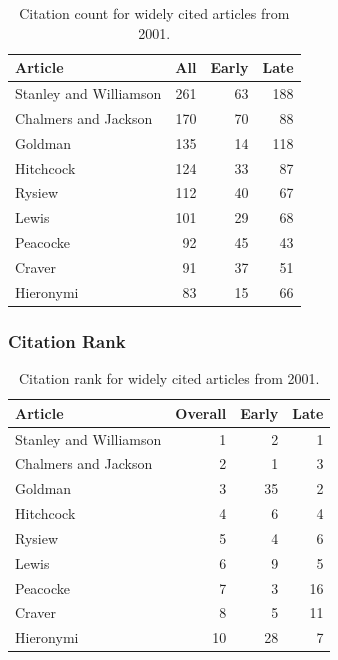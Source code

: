 \documentclass[
  10pt,
  letterpaper,
  DIV=11,
  numbers=noendperiod,
  twoside]{scrartcl}
\begin{document}
\begin{longtable}[]{@{}lrrr@{}}

\caption{\label{tbl-citation-count-2001}Citation count for widely cited
articles from 2001.}

\tabularnewline

\toprule\noalign{}
Article & All & Early & Late \\
\midrule\noalign{}
\endhead
\bottomrule\noalign{}
\endlastfoot
Stanley and Williamson & 261 & 63 & 188 \\
Chalmers and Jackson & 170 & 70 & 88 \\
Goldman & 135 & 14 & 118 \\
Hitchcock & 124 & 33 & 87 \\
Rysiew & 112 & 40 & 67 \\
Lewis & 101 & 29 & 68 \\
Peacocke & 92 & 45 & 43 \\
Craver & 91 & 37 & 51 \\
Hieronymi & 83 & 15 & 66 \\

\end{longtable}

\subsubsection*{Citation Rank}\label{sec-rank-2001}

\begin{longtable}[]{@{}lrrr@{}}

\caption{\label{tbl-citation-rank-2001}Citation rank for widely cited
articles from 2001.}

\tabularnewline

\toprule\noalign{}
Article & Overall & Early & Late \\
\midrule\noalign{}
\endhead
\bottomrule\noalign{}
\endlastfoot
Stanley and Williamson & 1 & 2 & 1 \\
Chalmers and Jackson & 2 & 1 & 3 \\
Goldman & 3 & 35 & 2 \\
Hitchcock & 4 & 6 & 4 \\
Rysiew & 5 & 4 & 6 \\
Lewis & 6 & 9 & 5 \\
Peacocke & 7 & 3 & 16 \\
Craver & 8 & 5 & 11 \\
Hieronymi & 10 & 28 & 7 \\

\end{longtable}
\end{document}
